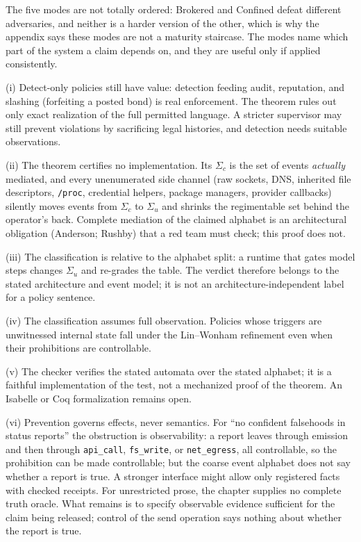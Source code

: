 \documentclass[11pt,a4paper]{article}
\theoremstyle{definition}
\theoremstyle{remark}
\begin{document}
The five modes are not totally ordered: Brokered
and Confined defeat different adversaries, and neither is a harder version of the
other, which is why the appendix says these modes are not a maturity staircase.
The modes name which part of the system a claim depends on, and they are useful
only if applied consistently.

\begin{pdboundary}
\setlength{\parskip}{4pt plus 1pt}
(i) Detect-only policies still have value: detection feeding audit, reputation, and
slashing (forfeiting a posted bond) is real enforcement. The theorem rules out only exact realization of the full
permitted language. A stricter supervisor may still prevent violations by sacrificing
legal histories, and detection needs suitable observations.

(ii) The theorem certifies no implementation. Its $\Sigma_c$ is the set of events
\emph{actually} mediated, and every unenumerated side channel (raw sockets, DNS, inherited
file descriptors, \texttt{/proc}, credential helpers, package managers, provider callbacks)
silently moves events from $\Sigma_c$ to $\Sigma_u$ and shrinks the regimentable set behind
the operator's back. Complete mediation of the claimed alphabet is an architectural
obligation (Anderson; Rushby) that a red team must check; this proof does not.

(iii) The
classification is relative to the alphabet split: a runtime that gates model steps changes
$\Sigma_u$ and re-grades the table. The verdict therefore belongs to the stated architecture and event model;
it is not an architecture-independent label for a policy sentence.

(iv) The classification assumes full observation. Policies whose triggers are
unwitnessed internal state fall under the Lin--Wonham refinement even when their
prohibitions are controllable.

(v) The checker verifies the stated automata over the stated
alphabet; it is a faithful implementation of the test, not a mechanized proof of the theorem.
An Isabelle or Coq formalization remains open.

(vi) Prevention governs effects, never
semantics. For ``no confident falsehoods in status reports'' the obstruction is
\mbox{observability}: a report leaves through emission and then through \texttt{api\_call},
\texttt{fs\_write}, or \texttt{net\_egress}, all controllable, so the prohibition can be made
controllable; but the coarse event alphabet does not say whether a report is true.
A stronger interface might allow only registered facts with checked receipts.
For unrestricted prose, the chapter supplies no complete truth oracle. What
remains is to specify observable evidence sufficient for the claim being
released; control of the send operation says nothing about whether the report
is true.
\end{pdboundary}
\end{document}
